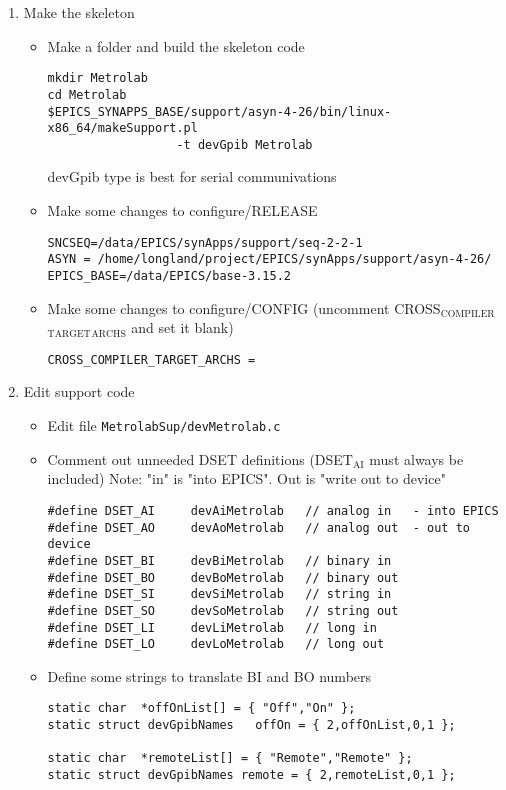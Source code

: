 \documentclass[11pt]{article}
\begin{document}
\begin{enumerate}
\item Make the skeleton
\label{sec-1-1-1}
\begin{itemize}
\item Make a folder and build the skeleton code
\begin{verbatim}
mkdir Metrolab
cd Metrolab
$EPICS_SYNAPPS_BASE/support/asyn-4-26/bin/linux-x86_64/makeSupport.pl 
                  -t devGpib Metrolab
\end{verbatim}
devGpib type is best for serial communivations
\item Make some changes to configure/RELEASE
\begin{verbatim}
SNCSEQ=/data/EPICS/synApps/support/seq-2-2-1
ASYN = /home/longland/project/EPICS/synApps/support/asyn-4-26/
EPICS_BASE=/data/EPICS/base-3.15.2
\end{verbatim}
\item Make some changes to configure/CONFIG
(uncomment CROSS$_{\text{COMPILER}}$$_{\text{TARGET}}$$_{\text{ARCHS}}$ and set it blank)
\begin{verbatim}
CROSS_COMPILER_TARGET_ARCHS =
\end{verbatim}
\end{itemize}
\item Edit support code
\label{sec-1-1-2}
\begin{itemize}
\item Edit file \verb~MetrolabSup/devMetrolab.c~
\item Comment out unneeded DSET definitions (DSET$_{\text{AI}}$ must always be
included)
Note: "in" is "into EPICS". Out is "write out to device"
\begin{verbatim}
#define DSET_AI     devAiMetrolab   // analog in   - into EPICS
#define DSET_AO     devAoMetrolab   // analog out  - out to device
#define DSET_BI     devBiMetrolab   // binary in
#define DSET_BO     devBoMetrolab   // binary out
#define DSET_SI     devSiMetrolab   // string in
#define DSET_SO     devSoMetrolab   // string out
#define DSET_LI     devLiMetrolab   // long in
#define DSET_LO     devLoMetrolab   // long out
\end{verbatim}
\item Define some strings to translate BI and BO numbers
\begin{verbatim}
static char  *offOnList[] = { "Off","On" };
static struct devGpibNames   offOn = { 2,offOnList,0,1 };    

static char  *remoteList[] = { "Remote","Remote" };
static struct devGpibNames remote = { 2,remoteList,0,1 };


\end{verbatim}
\end{itemize}
\end{enumerate}
\end{document}
